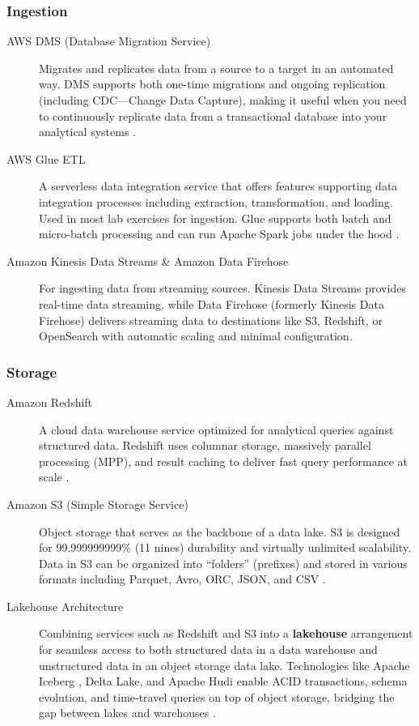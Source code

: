 \documentclass{article}
\begin{document}
\subsubsection{Ingestion}
\begin{description}
    \item[AWS DMS (Database Migration Service)] Migrates and replicates data from a source to a target in an automated way. DMS supports both one-time migrations and ongoing replication (including CDC---Change Data Capture), making it useful when you need to continuously replicate data from a transactional database into your analytical systems \cite{aws2023dms}.

    \item[AWS Glue ETL] A serverless data integration service that offers features supporting data integration processes including extraction, transformation, and loading. Used in most lab exercises for ingestion. Glue supports both batch and micro-batch processing and can run Apache Spark jobs under the hood \cite{aws2023glue}.

    \item[Amazon Kinesis Data Streams \& Amazon Data Firehose] For ingesting data from streaming sources. Kinesis Data Streams provides real-time data streaming, while Data Firehose (formerly Kinesis Data Firehose) delivers streaming data to destinations like S3, Redshift, or OpenSearch with automatic scaling and minimal configuration.
\end{description}

\subsubsection{Storage}
\begin{description}
    \item[Amazon Redshift] A cloud data warehouse service optimized for analytical queries against structured data. Redshift uses columnar storage, massively parallel processing (MPP), and result caching to deliver fast query performance at scale \cite{aws2023redshift}.

    \item[Amazon S3 (Simple Storage Service)] Object storage that serves as the backbone of a data lake. S3 is designed for 99.999999999\% (11 nines) durability and virtually unlimited scalability. Data in S3 can be organized into ``folders'' (prefixes) and stored in various formats including Parquet, Avro, ORC, JSON, and CSV \cite{aws2023s3}.

    \item[Lakehouse Architecture] Combining services such as Redshift and S3 into a \textbf{lakehouse} arrangement for seamless access to both structured data in a data warehouse and unstructured data in an object storage data lake. Technologies like Apache Iceberg \cite{iceberg2020}, Delta Lake, and Apache Hudi enable ACID transactions, schema evolution, and time-travel queries on top of object storage, bridging the gap between lakes and warehouses \cite{armbrust2021lakehouse}.
\end{description}
\end{document}
